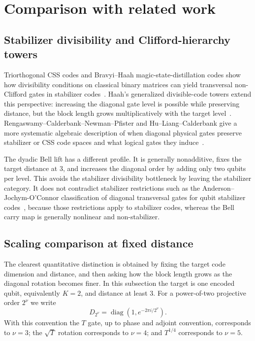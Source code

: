 \documentclass[11pt]{article}
\newcommand{\diag}{\operatorname{diag}}
\begin{document}
\section{Comparison with related work}
\label{sec:comparison}

\subsection{Stabilizer divisibility and Clifford-hierarchy towers}

Triorthogonal CSS codes and Bravyi--Haah magic-state-distillation codes show how divisibility
conditions on classical binary matrices can yield transversal non-Clifford gates in stabilizer
codes~\cite{BravyiHaah2012}.  Haah's generalized divisible-code towers extend this perspective: increasing the diagonal
gate level is possible while preserving distance, but the block length grows multiplicatively with
the target level~\cite{Haah2018}.  Rengaswamy--Calderbank--Newman--Pfister and Hu--Liang--Calderbank give a more
systematic algebraic description of when diagonal physical gates preserve stabilizer or CSS code
spaces and what logical gates they induce~\cite{RengaswamyCalderbankNewmanPfister2020,HuLiangCalderbank2022Channels,HuLiangCalderbank2022Divisible,HuLiangCalderbank2021Climbing}.

The dyadic Bell lift has a different profile.  It is generally nonadditive, fixes the target
distance at $3$, and increases the diagonal order by adding only two qubits per level.  This avoids
the stabilizer divisibility bottleneck by leaving the stabilizer category.  It does not contradict
stabilizer restrictions such as the Anderson--Jochym-O'Connor classification of diagonal
transversal gates for qubit stabilizer codes~\cite{AndersonJochymOConnor2016}, because those restrictions apply to stabilizer codes,
whereas the Bell carry map is generally nonlinear and non-stabilizer.

\subsection{Scaling comparison at fixed distance}
\label{sec:scaling-comparison}

The clearest quantitative distinction is obtained by fixing the target code dimension and
distance, and then asking how the block length grows as the diagonal rotation becomes finer.  In
this subsection the target is one encoded qubit, equivalently $K=2$, and distance at least $3$.
For a power-of-two projective order $2^\nu$ we write
\[
  D_{2^\nu}=\diag(1,e^{-2\pi i/2^\nu}).
\]
With this convention the $T$ gate, up to phase and adjoint convention, corresponds to $\nu=3$;
the $\sqrt T$ rotation corresponds to $\nu=4$; and $T^{1/4}$ corresponds to $\nu=5$.
\end{document}
